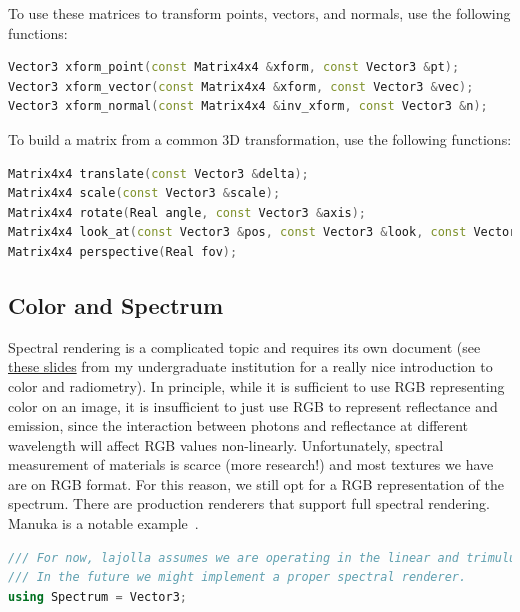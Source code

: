 \documentclass{article}
\begin{document}
To use these matrices to transform points, vectors, and normals, use the following functions:
\begin{lstlisting}[language=c++]
Vector3 xform_point(const Matrix4x4 &xform, const Vector3 &pt);
Vector3 xform_vector(const Matrix4x4 &xform, const Vector3 &vec);
Vector3 xform_normal(const Matrix4x4 &inv_xform, const Vector3 &n);
\end{lstlisting}

To build a matrix from a common 3D transformation, use the following functions:
\begin{lstlisting}[language=c++]
Matrix4x4 translate(const Vector3 &delta);
Matrix4x4 scale(const Vector3 &scale);
Matrix4x4 rotate(Real angle, const Vector3 &axis);
Matrix4x4 look_at(const Vector3 &pos, const Vector3 &look, const Vector3 &up);
Matrix4x4 perspective(Real fov);
\end{lstlisting}

\subsection{Color and Spectrum}
Spectral rendering is a complicated topic and requires its own document (see \href{https://www.csie.ntu.edu.tw/~cyy/courses/rendering/16fall/lectures/handouts/chap05_color_radiometry.pdf}{these slides} from my undergraduate institution for a really nice introduction to color and radiometry). In principle, while
it is sufficient to use RGB representing color on an image, it is insufficient to just use RGB
to represent reflectance and emission, since the interaction between photons and reflectance at different
wavelength will affect RGB values non-linearly. Unfortunately, spectral measurement of materials is scarce (more research!) and most textures we have are on RGB format. For this reason, we still opt for a RGB representation
of the spectrum. There are production renderers that support full spectral rendering. Manuka is a notable example~\cite{Fascione:2018:MBA}.

\begin{lstlisting}[language=c++]
/// For now, lajolla assumes we are operating in the linear and trimulus RGB color space.
/// In the future we might implement a proper spectral renderer.
using Spectrum = Vector3;
\end{lstlisting}
\end{document}
